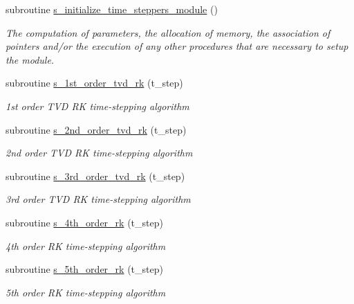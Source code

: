 \begin{DoxyCompactItemize}
\item 
subroutine \hyperlink{namespacem__time__steppers_a9287671ffb47dce60f906e5d885fb96f}{s\+\_\+initialize\+\_\+time\+\_\+steppers\+\_\+module} ()
\begin{DoxyCompactList}\small\item\em The computation of parameters, the allocation of memory, the association of pointers and/or the execution of any other procedures that are necessary to setup the module. \end{DoxyCompactList}\item 
subroutine \hyperlink{namespacem__time__steppers_a1057850f94e9e749da9687baa7478246}{s\+\_\+1st\+\_\+order\+\_\+tvd\+\_\+rk} (t\+\_\+step)
\begin{DoxyCompactList}\small\item\em 1st order T\+VD RK time-\/stepping algorithm \end{DoxyCompactList}\item 
subroutine \hyperlink{namespacem__time__steppers_a5b758874c713da801a47aa3d6246b2fd}{s\+\_\+2nd\+\_\+order\+\_\+tvd\+\_\+rk} (t\+\_\+step)
\begin{DoxyCompactList}\small\item\em 2nd order T\+VD RK time-\/stepping algorithm \end{DoxyCompactList}\item 
subroutine \hyperlink{namespacem__time__steppers_a1cc10f406268344cc54a55159c4ff08f}{s\+\_\+3rd\+\_\+order\+\_\+tvd\+\_\+rk} (t\+\_\+step)
\begin{DoxyCompactList}\small\item\em 3rd order T\+VD RK time-\/stepping algorithm \end{DoxyCompactList}\item 
subroutine \hyperlink{namespacem__time__steppers_ac53b0d079d514df2bf662bc0e042c8db}{s\+\_\+4th\+\_\+order\+\_\+rk} (t\+\_\+step)
\begin{DoxyCompactList}\small\item\em 4th order RK time-\/stepping algorithm \end{DoxyCompactList}\item 
subroutine \hyperlink{namespacem__time__steppers_a4920633ffe7f703c3827b956b21b7417}{s\+\_\+5th\+\_\+order\+\_\+rk} (t\+\_\+step)
\begin{DoxyCompactList}\small\item\em 5th order RK time-\/stepping algorithm \end{DoxyCompactList}\item 

\end{DoxyCompactItemize}
